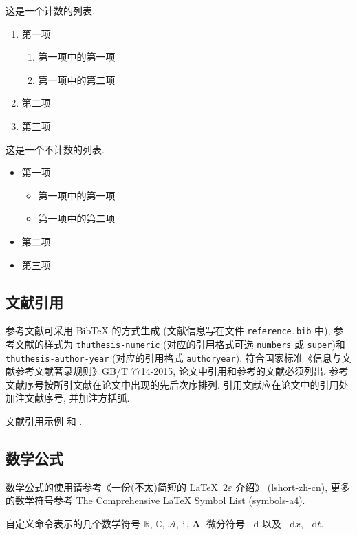 \documentclass[12pt,final]{article}
\numberwithin{equation}{section}
\numberwithin{figure}{section}
\numberwithin{table}{section}
\theoremstyle{plain}
\newcommand{\dif}{\mathop{}\!\mathrm{d}}
\newcommand{\CC}{\ensuremath{\mathbb{C}}}
\newcommand{\RR}{\ensuremath{\mathbb{R}}}
\newcommand{\dx}[1][x]{\mathop{}\!\mathrm{d}#1}
\newcommand{\ii}{\mathrm{i}\mkern1mu} %
\newcommand{\A}{\mathcal{A}}
\newcommand{\bA}{\boldsymbol{A}}
\begin{document}
这是一个计数的列表.
\begin{enumerate}%
  \item 第一项
    \begin{enumerate}
      \item 第一项中的第一项
      \item 第一项中的第二项
    \end{enumerate}
  \item 第二项
  \item 第三项
\end{enumerate}


这是一个不计数的列表.
\begin{itemize}%
  \item 第一项
  \begin{itemize}
    \item 第一项中的第一项
    \item 第一项中的第二项
  \end{itemize}
  \item 第二项
  \item 第三项
\end{itemize}



\subsection{文献引用}

参考文献可采用 BibTeX 的方式生成 (文献信息写在文件 \verb|reference.bib| 中), 参考文献的样式为 \verb|thuthesis-numeric| (对应的引用格式可选 \verb|numbers| 或  \verb|super|)和 \verb|thuthesis-author-year| (对应的引用格式 \verb|authoryear|), 符合国家标准《信息与文献参考文献著录规则》GB/T 7714-2015, 论文中引用和参考的文献必须列出. 参考文献序号按所引文献在论文中出现的先后次序排列. 引用文献应在论文中的引用处加注文献序号, 并加注方括弧.

文献引用示例 \cite{LiLiu1997} 和 \cite{Adams2003,Shen1994}.


\subsection{数学公式}

数学公式的使用请参考《一份(不太)简短的 \LaTeX~2$\varepsilon$ 介绍》 (lshort-zh-cn), 更多的数学符号参考 The Comprehensive LaTeX Symbol List (symbols-a4).

自定义命令表示的几个数学符号 $\RR$, $\CC$, $\A$, $\ii$, $\bA$. 微分符号 $\dif$ 以及 $\dx$, $\dx[t]$.
\end{document}
